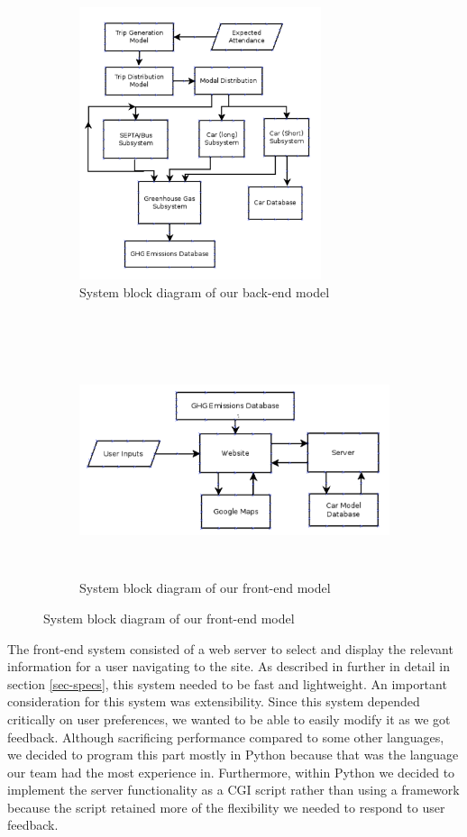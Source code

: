 \begin{figure}[htp]
  \centering
  \begin{subfigure}{14cm}
    \centering
    \includegraphics[height=8cm]{graphics/backend.png}
    \caption{System block diagram of our back-end model}
    \label{fig-back-end}
  \end{subfigure} \\
  \begin{subfigure}{14cm}
    \centering
    \includegraphics[height=6.79cm]{graphics/frontend.png}
    \caption{System block diagram of our front-end model}
    \label{fig-front-end}
  \end{subfigure}
\end{figure}

The front-end system consisted of a web server to select and display
the relevant information for a user navigating to the site. As
described in further in detail in section \ref{sec-specs}, this system
needed to be fast and lightweight. An important consideration for this
system was extensibility. Since this system depended critically on
user preferences, we wanted to be able to easily modify it as we got
feedback. Although sacrificing performance compared to some other
languages, we decided to program this part mostly in Python because
that was the language our team had the most experience
in. Furthermore, within Python we decided to implement the server
functionality as a CGI script rather than using a framework because
the script retained more of the flexibility we needed to respond to
user feedback.


